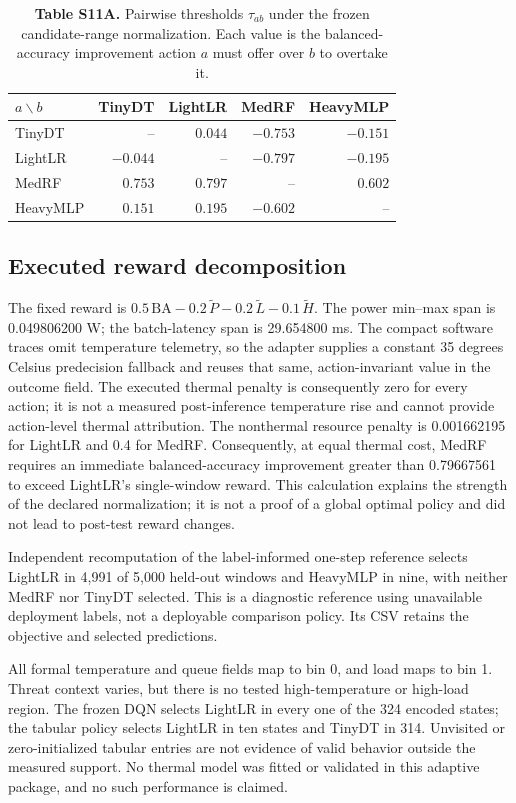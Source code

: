 \documentclass[10pt,a4paper]{article}
\begin{document}
\begin{table}[h!]
\centering\small
\caption*{\textbf{Table S11A.} Pairwise thresholds $\tau_{ab}$ under the frozen candidate-range normalization. Each value is the balanced-accuracy improvement action $a$ must offer over $b$ to overtake it.}
\setlength{\tabcolsep}{6pt}
\begin{tabular}{lrrrr}\toprule
$a\backslash b$ & TinyDT & LightLR & MedRF & HeavyMLP\\\midrule
TinyDT     & --       & $0.044$  & $-0.753$ & $-0.151$\\
LightLR    & $-0.044$ & --       & $-0.797$ & $-0.195$\\
MedRF      & $0.753$  & $0.797$  & --       & $0.602$\\
HeavyMLP   & $0.151$  & $0.195$  & $-0.602$ & --\\
\bottomrule\end{tabular}
\end{table}

\subsection{Executed reward decomposition}
The fixed reward is $0.5\,\mathrm{BA}-0.2\,\widetilde P-0.2\,\widetilde L-0.1\,\widetilde H$. The power min--max span is 0.049806200 W; the batch-latency span is 29.654800 ms. The compact software traces omit temperature telemetry, so the adapter supplies a constant 35 degrees Celsius predecision fallback and reuses that same, action-invariant value in the outcome field. The executed thermal penalty is consequently zero for every action; it is not a measured post-inference temperature rise and cannot provide action-level thermal attribution. The nonthermal resource penalty is 0.001662195 for LightLR and 0.4 for MedRF. Consequently, at equal thermal cost, MedRF requires an immediate balanced-accuracy improvement greater than 0.79667561 to exceed LightLR's single-window reward. This calculation explains the strength of the declared normalization; it is not a proof of a global optimal policy and did not lead to post-test reward changes.

Independent recomputation of the label-informed one-step reference selects LightLR in 4,991 of 5,000 held-out windows and HeavyMLP in nine, with neither MedRF nor TinyDT selected. This is a diagnostic reference using unavailable deployment labels, not a deployable comparison policy. Its CSV retains the objective and selected predictions.

All formal temperature and queue fields map to bin 0, and load maps to bin 1. Threat context varies, but there is no tested high-temperature or high-load region. The frozen DQN selects LightLR in every one of the 324 encoded states; the tabular policy selects LightLR in ten states and TinyDT in 314. Unvisited or zero-initialized tabular entries are not evidence of valid behavior outside the measured support. No thermal model was fitted or validated in this adaptive package, and no such performance is claimed.
\end{document}
